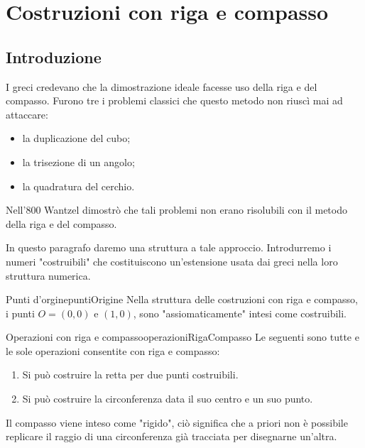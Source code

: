 \chapter{Costruzioni con riga e compasso}
%
%
\section{Introduzione}

I greci credevano che la dimostrazione ideale facesse uso della riga e del compasso. Furono tre i problemi classici che questo metodo non riuscì mai ad attaccare:
\begin{itemize}
	\item la duplicazione del cubo;
	\item la trisezione di un angolo;
	\item la quadratura del cerchio.
\end{itemize}
Nell'800 Wantzel dimostrò che tali problemi non erano risolubili con il metodo della riga e del compasso.

In questo paragrafo daremo una struttura a tale approccio. Introdurremo i numeri "costruibili" che costituiscono un'estensione usata dai greci nella loro struttura numerica.

\begin{defn}{Punti d'orgine}{puntiOrigine}
	Nella struttura delle costruzioni con riga e compasso, i punti \(O=(0,0)\) e \((1,0)\), sono "assiomaticamente" intesi come costruibili.
\end{defn}

\begin{defn}{Operazioni con riga e compasso}{operazioniRigaCompasso}
	Le seguenti sono tutte e le sole operazioni consentite con riga e compasso:
	\begin{enumerate}
		\item Si può costruire la retta per due punti costruibili.
		\item Si può costruire la circonferenza data il suo centro e un suo punto.
	\end{enumerate}
\end{defn}

\begin{oss}
	Il compasso viene inteso come "rigido", ciò significa che a priori non è possibile replicare il raggio di una circonferenza già tracciata per disegnarne un'altra.
\end{oss}

